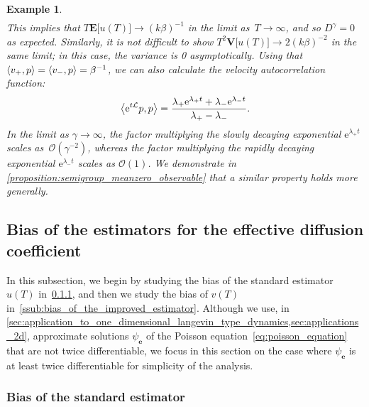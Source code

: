 \documentclass[11pt,a4paper]{article}
\newcommand{\e}{\mathrm{e}}
\newcommand{\expect}[0]{\mathbf{E}}
\newcommand{\var}[0]{\mathbf{V}}
\newcommand{\vect}[1]{\boldsymbol{\mathbf #1}}
\theoremstyle{plain}
\newtheorem{example}{Example}[section]
\numberwithin{equation}{section}
\begin{document}
\begin{example}
\begin{align*}
    \end{align*}
    This implies that
    \(
        T \expect \bigl[ u(T) \bigr] \to (k \beta)^{-1}
    \)
    in the limit as~$T \to \infty$,
    and so $D^{\gamma} = 0$ as expected.
    Similarly, it is not difficult to show $T^2\var \bigl[ u(T) \bigr] \to 2 (k \beta)^{-2}$ in the same limit;
    in this case, the variance is 0 asymptotically.
    Using that $\ip{v_+}{p} = \ip{v_-}{p} = \beta^{-1}$,
    we can also calculate the velocity autocorrelation function:
    \begin{equation}
        \label{eq:velocity_autocorrelation_quadratic}
        \ip{\e^{t \mathcal L}p}{p} =
        \frac{\lambda_+ \e^{\lambda_+ t} + \lambda_- \e^{\lambda_- t}}{\lambda_+ - \lambda_-}.
    \end{equation}
    In the limit as $\gamma \to \infty$,
    the factor multiplying the slowly decaying exponential $\e^{\lambda_+ t}$ scales as~$\mathcal O(\gamma^{-2})$,
    whereas the factor multiplying the rapidly decaying exponential $\e^{\lambda_- t}$ scales as $\mathcal O(1)$.
    We demonstrate in \cref{proposition:semigroup_meanzero_observable} that a similar property holds more generally.
\end{example}

\subsection{Bias of the estimators for the effective diffusion coefficient}%
\label{sub:bias}

In this subsection,
we begin by studying the bias of the standard estimator $u(T)$ in~\cref{ssub:bias_of_the_standard_estimator},
and then we study the bias of $v(T)$ in~\cref{ssub:bias_of_the_improved_estimator}.
Although we use, in \cref{sec:application_to_one_dimensional_langevin_type_dynamics,sec:applications_2d},
approximate solutions $\psi_{\vect e}$ of the Poisson equation~\eqref{eq:poisson_equation} that are not twice differentiable,
we focus in this section on the case where $\psi_{\vect e}$ is at least twice differentiable for simplicity of the analysis.

\subsubsection{Bias of the standard estimator}%
\label{ssub:bias_of_the_standard_estimator}
\end{document}
